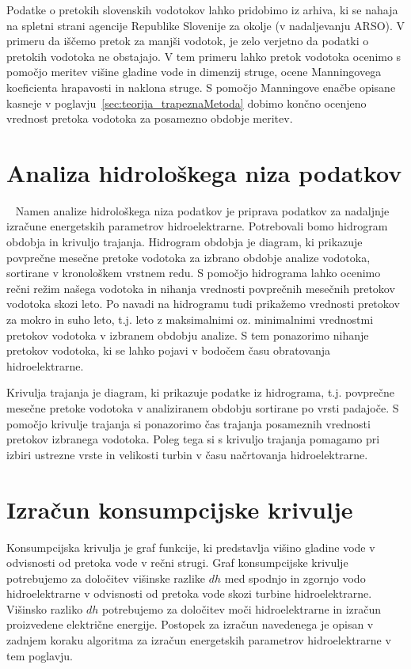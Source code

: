  
 
  Podatke o pretokih slovenskih vodotokov lahko pridobimo iz arhiva, ki se nahaja na spletni strani agencije Republike Slovenije za okolje (v nadaljevanju ARSO). V primeru da iščemo pretok za manjši vodotok, je zelo verjetno da podatki o pretokih vodotoka ne obstajajo. V tem primeru lahko pretok vodotoka ocenimo s pomočjo meritev višine gladine vode in dimenzij struge, ocene Manningovega koeficienta hrapavosti in naklona struge. S pomočjo Manningove enačbe opisane kasneje v poglavju~\ref{sec:teorija_trapeznaMetoda} dobimo končno ocenjeno vrednost pretoka vodotoka za posamezno obdobje meritev.




\section{Analiza hidrološkega niza podatkov}~\label{sec:teorija_hidrogramObdobja}
Namen analize hidrološkega niza podatkov je priprava podatkov za nadaljnje izračune energetskih parametrov hidroelektrarne. Potrebovali bomo hidrogram obdobja in krivuljo trajanja. Hidrogram obdobja je diagram, ki prikazuje povprečne mesečne pretoke vodotoka za izbrano obdobje analize vodotoka, sortirane v kronološkem vrstnem redu. S pomočjo hidrograma lahko ocenimo rečni režim našega vodotoka in nihanja vrednosti povprečnih mesečnih pretokov vodotoka skozi leto. Po navadi na hidrogramu tudi prikažemo vrednosti pretokov za mokro in suho leto, t.j. leto z maksimalnimi oz. minimalnimi vrednostmi pretokov vodotoka v izbranem obdobju analize. S tem ponazorimo nihanje pretokov vodotoka, ki se lahko pojavi v bodočem času obratovanja hidroelektrarne.


Krivulja trajanja je diagram, ki prikazuje podatke iz hidrograma, t.j. povprečne mesečne pretoke vodotoka v analiziranem obdobju sortirane po vrsti padajoče. S pomočjo krivulje trajanja si ponazorimo čas trajanja posameznih vrednosti pretokov izbranega vodotoka. Poleg tega si s krivuljo trajanja pomagamo pri izbiri ustrezne vrste in velikosti turbin v času načrtovanja hidroelektrarne.


\section{Izračun konsumpcijske krivulje}
Konsumpcijska krivulja je graf funkcije, ki predstavlja višino gladine vode v odvisnosti od pretoka vode v rečni strugi. Graf konsumpcijske krivulje potrebujemo za določitev višinske razlike $dh$ med spodnjo in zgornjo vodo hidroelektrarne v odvisnosti od pretoka vode skozi turbine hidroelektrarne. Višinsko razliko $dh$ potrebujemo za določitev moči hidroelektrarne in izračun proizvedene električne energije. Postopek za izračun navedenega je opisan v zadnjem koraku algoritma za izračun energetskih parametrov hidroelektrarne v tem poglavju.



